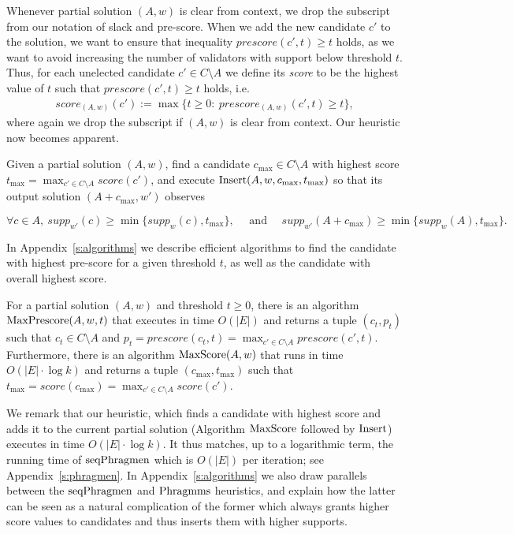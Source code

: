 Whenever partial solution $(A,w)$ is clear from context, we drop the subscript from our notation of slack and pre-score. 
When we add the new candidate $c'$ to the solution, we want to ensure that inequality $prescore(c',t)\geq t$ holds, as we want to avoid increasing the number of validators with support below threshold $t$. 
Thus, for each unelected candidate $c'\in C\setminus A$ we define its \emph{score} to be the highest value of $t$ such that $prescore(c',t) \geq t$ holds, i.e. 
%
\begin{align}
    score_{(A,w)}(c'):=\max\{t\geq 0: \ prescore_{(A,w)}(c',t)\geq t\},
\end{align}
%
where again we drop the subscript if $(A,w)$ is clear from context. Our heuristic now becomes apparent.

\begin{heuristic}[$\phragmms$]
Given a partial solution $(A,w)$, find a candidate $c_{\max}\in C\setminus A$ with highest score $t_{\max}=\max_{c'\in C\setminus A} score(c')$, and execute $\operatorname{Insert}(A,w,c_{\max},t_{\max})$ so that its output solution $(A+c_{\max},w')$ observes 

$$\forall c\in A, \ supp_{w'}(c)\geq \min\{supp_w(c), t_{\max}\}, \quad \text{ and } \quad supp_{w'}(A+c_{\max})\geq \min \Big\{ supp_w(A), t_{\max}\Big\}.$$
\end{heuristic}

In Appendix~\ref{s:algorithms} we describe efficient algorithms to find the candidate with highest pre-score for a given threshold $t$, as well as the candidate with overall highest score.

\begin{theorem}\label{thm:runtimes}
For a partial solution $(A,w)$ and threshold $t\geq 0$, there is an algorithm $\operatorname{MaxPrescore}(A,w,t)$ that executes in time $O(|E|)$ and returns a tuple $(c_t,p_t)$ such that $c_t\in C\setminus A$ and $p_t=prescore(c_t,t)=\max_{c'\in C\setminus A} prescore(c',t)$.
Furthermore, there is an algorithm $\operatorname{MaxScore}(A,w)$ that runs in time $O(|E|\cdot \log k)$ and returns a tuple $(c_{\max}, t_{\max})$ such that $t_{\max}=score(c_{\max})=\max_{c'\in C\setminus A} score(c')$.
\end{theorem}

We remark that our heuristic, which finds a candidate with highest score and adds it to the current partial solution (Algorithm $\operatorname{MaxScore}$ followed by $\operatorname{Insert}$) executes in time $O(|E|\cdot \log k)$. 
It thus matches, up to a logarithmic term, the running time of $\operatorname{seqPhragmen}$ which is $O(|E|)$ per iteration; see Appendix~\ref{s:phragmen}. 
In Appendix~\ref{s:algorithms} we also draw parallels between the $\operatorname{seqPhragmen}$ and $\phragmms$ heuristics, and explain how the latter can be seen as a natural complication of the former which always grants higher score values to candidates and thus inserts them with higher supports.

